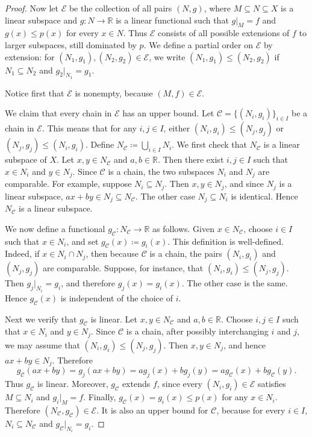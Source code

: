 \begin{proof}
    Now let \(\mathcal{E}\) be the collection of all pairs \((N, g)\), where \(M \subseteq N \subseteq X\) is a linear subspace and \(g : N \to \mathbb{R}\) is a linear functional such that \(g\vert_M = f\) and \(g(x) \leq p(x)\) for every \(x \in N\). Thus \(\mathcal{E}\) consists of all possible extensions of \(f\) to larger subspaces, still dominated by \(p\). We define a partial order on \(\mathcal{E}\) by extension: for \((N_1, g_1), (N_2, g_2) \in \mathcal{E}\), we write \((N_1, g_1) \leq (N_2, g_2)\) if \(N_1 \subseteq N_2\) and \(g_2\vert_{N_1} = g_1\).

    Notice first that \(\mathcal{E}\) is nonempty, because \((M, f) \in \mathcal{E}\).

    We claim that every chain in \(\mathcal{E}\) has an upper bound. Let \(\mathcal{C} = \{(N_i, g_i)\}_{i \in I}\) be a chain in \(\mathcal{E}\). This means that for any \(i, j \in I\), either \((N_i, g_i) \leq (N_j, g_j)\) or \((N_j, g_j) \leq (N_i, g_i)\). Define \(N_{\mathcal{C}} \coloneqq \bigcup_{i \in I} N_i\). We first check that \(N_{\mathcal{C}}\) is a linear subspace of \(X\). Let \(x, y \in N_{\mathcal{C}}\) and \(a, b \in \mathbb{R}\). Then there exist \(i, j \in I\) such that \(x \in N_i\) and \(y \in N_j\). Since \(\mathcal{C}\) is a chain, the two subspaces \(N_i\) and \(N_j\) are comparable. For example, suppose \(N_i \subseteq N_j\). Then \(x, y \in N_j\), and since \(N_j\) is a linear subspace, \(ax + by \in N_j \subseteq N_{\mathcal{C}}\). The other case \(N_j \subseteq N_i\) is identical. Hence \(N_{\mathcal{C}}\) is a linear subspace.

    We now define a functional \(g_{\mathcal{C}} : N_{\mathcal{C}} \to \mathbb{R}\) as follows. Given \(x \in N_{\mathcal{C}}\), choose \(i \in I\) such that \(x \in N_i\), and set \(g_{\mathcal{C}}(x) \coloneqq g_i(x)\). This definition is well-defined. Indeed, if \(x \in N_i \cap N_j\), then because \(\mathcal{C}\) is a chain, the pairs \((N_i, g_i)\) and \((N_j, g_j)\) are comparable. Suppose, for instance, that \((N_i, g_i) \leq (N_j, g_j)\). Then \(g_j\vert_{N_i} = g_i\), and therefore \(g_j(x) = g_i(x)\). The other case is the same. Hence \(g_{\mathcal{C}}(x)\) is independent of the choice of \(i\).

    Next we verify that \(g_{\mathcal{C}}\) is linear. Let \(x, y \in N_{\mathcal{C}}\) and \(a, b \in \mathbb{R}\). Choose \(i, j \in I\) such that \(x \in N_i\) and \(y \in N_j\). Since \(\mathcal{C}\) is a chain, after possibly interchanging \(i\) and \(j\), we may assume that \((N_i, g_i) \leq (N_j, g_j)\). Then \(x, y \in N_j\), and hence \(ax + by \in N_j\). Therefore
    \[
        g_{\mathcal{C}}(ax + by) = g_j(ax + by) = a g_j(x) + b g_j(y) = a g_{\mathcal{C}}(x) + b g_{\mathcal{C}}(y).
    \]
    Thus \(g_{\mathcal{C}}\) is linear. Moreover, \(g_{\mathcal{C}}\) extends \(f\), since every \((N_i, g_i) \in \mathcal{E}\) satisfies \(M \subseteq N_i\) and \(g_i\vert_M = f\). Finally, \(g_{\mathcal{C}}(x) = g_i(x) \leq p(x)\) for any \(x \in N_i\). Therefore \((N_{\mathcal{C}}, g_{\mathcal{C}}) \in \mathcal{E}\). It is also an upper bound for \(\mathcal{C}\), because for every \(i \in I\), \(N_i \subseteq N_{\mathcal{C}}\) and \(g_{\mathcal{C}}\vert_{N_i} = g_i\).


\end{proof}
